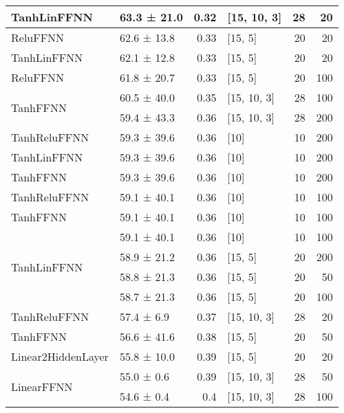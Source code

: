 \begin{longtable}{llrlrr}
 \hline
TanhLinFFNN         & 63.3 ± 21.0 &  0.32 & [15, 10, 3]    &         28 &       20 \\
 \hline
ReluFFNN         & 62.6 ± 13.8 &  0.33 & [15, 5]        &         20 &       20 \\
 \hline
TanhLinFFNN         & 62.1 ± 12.8 &  0.33 & [15, 5]        &         20 &       20 \\
 \hline
ReluFFNN         & 61.8 ± 20.7 &  0.33 & [15, 5]        &         20 &      100 \\
 \hline
\multirow{2}{*}{TanhFFNN}         & 60.5 ± 40.0 &  0.35 & [15, 10, 3]    &         28 &      100 \\
         & 59.4 ± 43.3 &  0.36 & [15, 10, 3]    &         28 &      200 \\
 \hline
TanhReluFFNN         & 59.3 ± 39.6 &  0.36 & [10]           &         10 &      200 \\
 \hline
TanhLinFFNN         & 59.3 ± 39.6 &  0.36 & [10]           &         10 &      200 \\
 \hline
TanhFFNN         & 59.3 ± 39.6 &  0.36 & [10]           &         10 &      200 \\
 \hline
TanhReluFFNN         & 59.1 ± 40.1 &  0.36 & [10]           &         10 &      100 \\
 \hline
TanhFFNN         & 59.1 ± 40.1 &  0.36 & [10]           &         10 &      100 \\
 \hline
\multirow{4}{*}{TanhLinFFNN}         & 59.1 ± 40.1 &  0.36 & [10]           &         10 &      100 \\
         & 58.9 ± 21.2 &  0.36 & [15, 5]        &         20 &      200 \\
         & 58.8 ± 21.3 &  0.36 & [15, 5]        &         20 &       50 \\
         & 58.7 ± 21.3 &  0.36 & [15, 5]        &         20 &      100 \\
 \hline
TanhReluFFNN         & 57.4 ± 6.9  &  0.37 & [15, 10, 3]    &         28 &       20 \\
 \hline
TanhFFNN         & 56.6 ± 41.6 &  0.38 & [15, 5]        &         20 &       50 \\
 \hline
Linear2HiddenLayer         & 55.8 ± 10.0 &  0.39 & [15, 5]        &         20 &       20 \\
 \hline
\multirow{5}{*}{LinearFFNN}         & 55.0 ± 0.6  &  0.39 & [15, 10, 3]    &         28 &       50 \\
         & 54.6 ± 0.4  &  0.4  & [15, 10, 3]    &         28 &      100 \\

\end{longtable}
